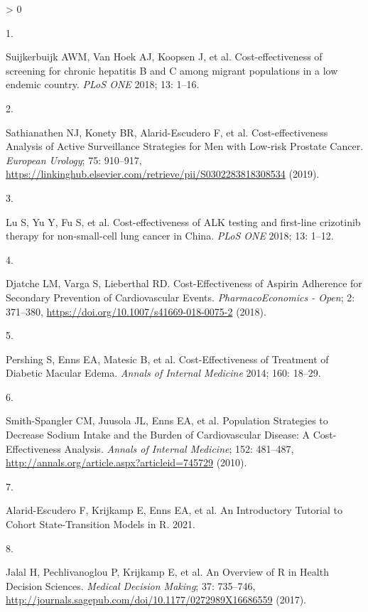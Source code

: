\documentclass[
]{article}
\newlength{\cslhangindent}
\newlength{\csllabelwidth}
\newenvironment{CSLReferences}[2] %
 {%
  \setlength{\parindent}{0pt}
  \ifodd #1 \everypar{\setlength{\hangindent}{\cslhangindent}}\ignorespaces\fi
  \ifnum #2 > 0
  \setlength{\parskip}{#2\baselineskip}
  \fi
 }%
 {}
\newcommand{\CSLLeftMargin}[1]{\parbox[t]{\csllabelwidth}{#1}}
\newcommand{\CSLRightInline}[1]{\parbox[t]{\linewidth - \csllabelwidth}{#1}\break}
\begin{document}
\hypertarget{refs}{}
\begin{CSLReferences}{0}{0}
\leavevmode\hypertarget{ref-Suijkerbuijk2018}{}%
\CSLLeftMargin{1. }
\CSLRightInline{Suijkerbuijk AWM, Van Hoek AJ, Koopsen J, et al. {Cost-effectiveness of screening for chronic hepatitis B and C among migrant populations in a low endemic country}. \emph{PLoS ONE} 2018; 13: 1--16.}

\leavevmode\hypertarget{ref-Sathianathen2018a}{}%
\CSLLeftMargin{2. }
\CSLRightInline{Sathianathen NJ, Konety BR, Alarid-Escudero F, et al. {Cost-effectiveness Analysis of Active Surveillance Strategies for Men with Low-risk Prostate Cancer}. \emph{European Urology}; 75: 910--917, \url{https://linkinghub.elsevier.com/retrieve/pii/S0302283818308534} (2019).}

\leavevmode\hypertarget{ref-Lu2018b}{}%
\CSLLeftMargin{3. }
\CSLRightInline{Lu S, Yu Y, Fu S, et al. {Cost-effectiveness of ALK testing and first-line crizotinib therapy for non-small-cell lung cancer in China}. \emph{PLoS ONE} 2018; 13: 1--12.}

\leavevmode\hypertarget{ref-Djatche2018}{}%
\CSLLeftMargin{4. }
\CSLRightInline{Djatche LM, Varga S, Lieberthal RD. {Cost-Effectiveness of Aspirin Adherence for Secondary Prevention of Cardiovascular Events}. \emph{PharmacoEconomics - Open}; 2: 371--380, \url{https://doi.org/10.1007/s41669-018-0075-2} (2018).}

\leavevmode\hypertarget{ref-Pershing2014}{}%
\CSLLeftMargin{5. }
\CSLRightInline{Pershing S, Enns EA, Matesic B, et al. {Cost-Effectiveness of Treatment of Diabetic Macular Edema}. \emph{Annals of Internal Medicine} 2014; 160: 18--29.}

\leavevmode\hypertarget{ref-Smith-Spangler2010}{}%
\CSLLeftMargin{6. }
\CSLRightInline{Smith-Spangler CM, Juusola JL, Enns EA, et al. {Population Strategies to Decrease Sodium Intake and the Burden of Cardiovascular Disease: A Cost-Effectiveness Analysis}. \emph{Annals of Internal Medicine}; 152: 481--487, \url{http://annals.org/article.aspx?articleid=745729} (2010).}

\leavevmode\hypertarget{ref-Alarid-Escudero2021a}{}%
\CSLLeftMargin{7. }
\CSLRightInline{Alarid-Escudero F, Krijkamp E, Enns EA, et al. {An Introductory Tutorial to Cohort State-Transition Models in R}. 2021.}

\leavevmode\hypertarget{ref-Jalal2017b}{}%
\CSLLeftMargin{8. }
\CSLRightInline{Jalal H, Pechlivanoglou P, Krijkamp E, et al. {An Overview of R in Health Decision Sciences}. \emph{Medical Decision Making}; 37: 735--746, \url{http://journals.sagepub.com/doi/10.1177/0272989X16686559} (2017).}


\end{CSLReferences}
\end{document}
